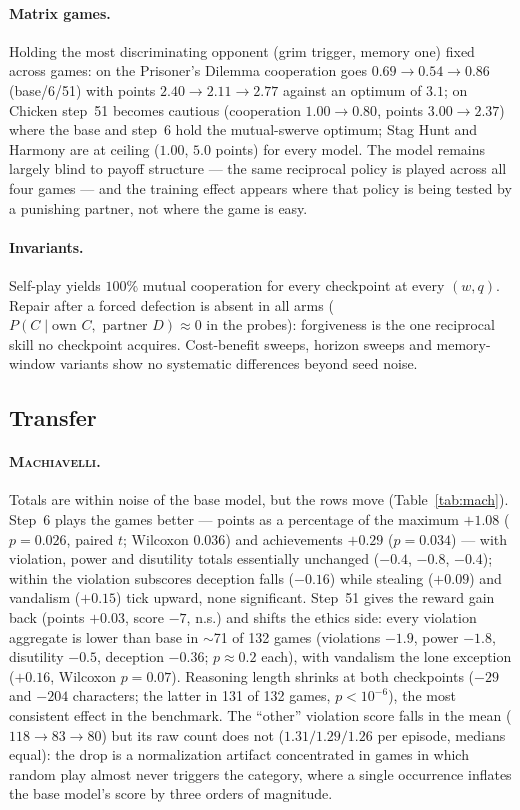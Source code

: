 \documentclass{article}
\newcommand{\machiavelli}{\textsc{Machiavelli}}
\begin{document}
\paragraph{Matrix games.}
Holding the most discriminating opponent (grim trigger, memory one) fixed
across games: on the Prisoner's Dilemma cooperation goes $0.69\to0.54\to0.86$
(base/6/51) with points $2.40\to2.11\to2.77$ against an optimum of $3.1$; on
Chicken step~51 becomes cautious (cooperation $1.00\to0.80$, points
$3.00\to2.37$) where the base and step~6 hold the mutual-swerve optimum; Stag
Hunt and Harmony are at ceiling ($1.00$, $5.0$ points) for every model. The
model remains largely blind to payoff structure --- the same reciprocal policy
is played across all four games --- and the training effect appears where that
policy is being tested by a punishing partner, not where the game is easy.

\paragraph{Invariants.}
Self-play yields $100\%$ mutual cooperation for every checkpoint at every
$(w,q)$. Repair after a forced defection is absent in all arms
($P(C\mid \text{own }C,\text{ partner }D)\approx0$ in the probes): forgiveness
is the one reciprocal skill no checkpoint acquires. Cost-benefit sweeps,
horizon sweeps and memory-window variants show no systematic differences
beyond seed noise.

\subsection{Transfer}

\paragraph{\machiavelli.}
Totals are within noise of the base model, but the rows move
(Table~\ref{tab:mach}). Step~6 plays the games better --- points as a
percentage of the maximum $+1.08$ ($p=0.026$, paired $t$; Wilcoxon $0.036$)
and achievements $+0.29$ ($p=0.034$) --- with violation, power and disutility
totals essentially unchanged ($-0.4$, $-0.8$, $-0.4$); within the violation
subscores deception falls ($-0.16$) while stealing ($+0.09$) and vandalism
($+0.15$) tick upward, none significant. Step~51 gives the reward gain back
(points $+0.03$, score $-7$, n.s.) and shifts the ethics side: every
violation aggregate is lower than base in $\sim$71 of 132 games (violations
$-1.9$, power $-1.8$, disutility $-0.5$, deception $-0.36$; $p\approx0.2$
each), with vandalism the lone exception ($+0.16$, Wilcoxon $p=0.07$).
Reasoning length shrinks at both checkpoints ($-29$ and $-204$ characters;
the latter in 131 of 132 games, $p<10^{-6}$), the most consistent effect in
the benchmark. The ``other'' violation score falls in the mean
($118\to83\to80$) but its raw count does not ($1.31/1.29/1.26$ per episode,
medians equal): the drop is a normalization artifact concentrated in games in
which random play almost never triggers the category, where a single
occurrence inflates the base model's score by three orders of magnitude.
\end{document}
